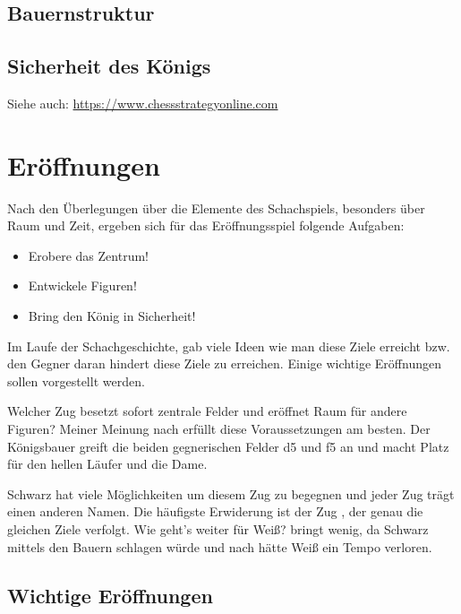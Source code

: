 \documentclass[
  a4paper,
  justified,
  nobib,
]{tufte-handout}
\begin{document}
\subsection{Bauernstruktur}%
\label{sub:bauernstruktur}

\subsection{Sicherheit des Königs}%
\label{sub:sicherheit_des_konigs}

Siehe auch: \url{https://www.chessstrategyonline.com}

\section{Eröffnungen}%
\label{sec:eroffnungen}

Nach den Überlegungen über die Elemente des Schachspiels, besonders über Raum und Zeit,
ergeben sich für das Eröffnungsspiel folgende Aufgaben:
\begin{itemize}
  \item Erobere das Zentrum!
  \item Entwickele Figuren!
  \item Bring den König in Sicherheit!
\end{itemize}

Im Laufe der Schachgeschichte, gab viele Ideen wie man diese Ziele erreicht bzw. den
Gegner daran hindert diese Ziele zu erreichen. Einige wichtige Eröffnungen sollen
vorgestellt werden.

\newchessgame
Welcher Zug besetzt sofort zentrale Felder und eröffnet Raum für andere Figuren? Meiner
Meinung nach erfüllt  diese Voraussetzungen am besten. Der Königsbauer
greift die beiden gegnerischen Felder d5 und f5 an und macht Platz für den hellen Läufer
und die Dame.

Schwarz hat viele Möglichkeiten um diesem Zug zu begegnen und jeder Zug trägt einen
anderen Namen. Die häufigste Erwiderung ist der Zug , der genau die
gleichen Ziele verfolgt. Wie geht's weiter für Weiß?  bringt wenig, da
Schwarz mittels  den Bauern schlagen würde und nach  hätte Weiß ein Tempo verloren.

\subsection{Wichtige Eröffnungen}%
\label{sub:wichtige_eroffnungen}
\end{document}
